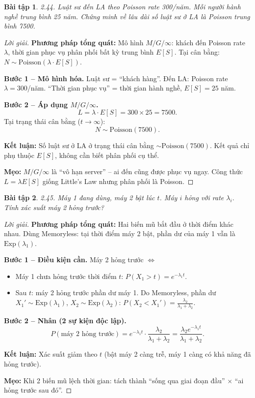 \documentclass[8pt,a4paper]{article}
\newtheorem{exercise}{Bài tập}
\newenvironment{solution}{\begin{proof}[Lời giải]}{\end{proof}}
\begin{document}
\begin{exercise}
2.44. Luật sư đến LA theo Poisson rate 300/năm. Mỗi người hành nghề trung bình 25 năm. Chứng minh về lâu dài số luật sư ở LA là Poisson trung bình 7500.
\end{exercise}
\begin{solution}
\textbf{Phương pháp tổng quát:} Mô hình $M/G/\infty$: khách đến Poisson rate $\lambda$, thời gian phục vụ phân phối bất kỳ trung bình $E[S]$. Tại cân bằng: $N \sim \text{Poisson}(\lambda \cdot E[S])$.

\textbf{Bước 1 -- Mô hình hóa.} Luật sư = ``khách hàng''. Đến LA: Poisson rate $\lambda = 300$/năm. ``Thời gian phục vụ'' = thời gian hành nghề, $E[S] = 25$ năm.

\textbf{Bước 2 -- Áp dụng $M/G/\infty$.}
\[
  L = \lambda \cdot E[S] = 300 \times 25 = 7500.
\]
Tại trạng thái cân bằng ($t \to \infty$):
\[
  \boxed{N \sim \text{Poisson}(7500)}.
\]

\textbf{Kết luận:} Số luật sư ở LA ở trạng thái cân bằng $\sim \text{Poisson}(7500)$. Kết quả chỉ phụ thuộc $E[S]$, không cần biết phân phối cụ thể.

\textbf{Mẹo:} $M/G/\infty$ là ``vô hạn server'' -- ai đến cũng được phục vụ ngay. Công thức $L = \lambda E[S]$ giống Little's Law nhưng phân phối là Poisson.
\end{solution}

\begin{exercise}
2.45. Máy 1 đang dùng, máy 2 bật lúc $t$. Máy $i$ hỏng với rate $\lambda_i$. Tính xác suất máy 2 hỏng trước?
\end{exercise}
\begin{solution}
\textbf{Phương pháp tổng quát:} Hai biến mũ bắt đầu ở thời điểm khác nhau. Dùng Memoryless: tại thời điểm máy 2 bật, phần dư của máy 1 vẫn là $\text{Exp}(\lambda_1)$.

\textbf{Bước 1 -- Điều kiện cần.} Máy 2 hỏng trước $\Leftrightarrow$
\begin{itemize}[nosep]
  \item Máy 1 chưa hỏng trước thời điểm $t$: $P(X_1 > t) = e^{-\lambda_1 t}$.
  \item Sau $t$: máy 2 hỏng trước phần dư máy 1. Do Memoryless, phần dư $X_1' \sim \text{Exp}(\lambda_1)$, $X_2 \sim \text{Exp}(\lambda_2)$: $P(X_2 < X_1') = \frac{\lambda_2}{\lambda_1+\lambda_2}$.
\end{itemize}

\textbf{Bước 2 -- Nhân (2 sự kiện độc lập).}
\[
  P(\text{máy 2 hỏng trước}) = e^{-\lambda_1 t} \cdot \frac{\lambda_2}{\lambda_1 + \lambda_2} = \boxed{\frac{\lambda_2 e^{-\lambda_1 t}}{\lambda_1 + \lambda_2}}.
\]

\textbf{Kết luận:} Xác suất giảm theo $t$ (bật máy 2 càng trễ, máy 1 càng có khả năng đã hỏng trước).

\textbf{Mẹo:} Khi 2 biến mũ lệch thời gian: tách thành ``sống qua giai đoạn đầu'' $\times$ ``ai hỏng trước sau đó''.
\end{solution}
\end{document}
